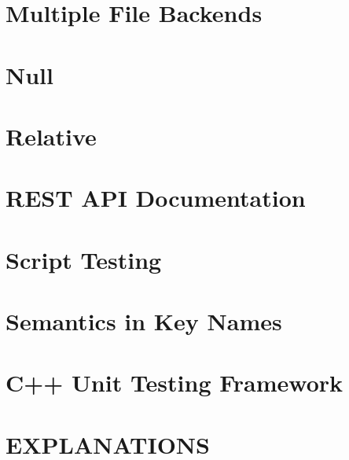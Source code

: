 \let\mypdfximage\pdfximage\def\pdfximage{\immediate\mypdfximage}\documentclass[twoside]{book}
\newcommand{\+}{\discretionary{\mbox{\scriptsize$\hookleftarrow$}}{}{}}
\begin{document}
\chapter{Multiple File Backends}
\label{doc_decisions_6_implemented_multiple_file_backends_md}

\chapter{Null}
\label{doc_decisions_6_implemented_null_md}

\chapter{Relative}
\label{doc_decisions_6_implemented_relative_md}

\chapter{REST API Documentation}
\label{doc_decisions_6_implemented_rest_api_documentation_md}

\chapter{Script Testing}
\label{doc_decisions_6_implemented_script_testing_md}

\chapter{Semantics in Key Names}
\label{doc_decisions_6_implemented_semantics_name_md}

\chapter{C++ Unit Testing Framework}
\label{doc_decisions_6_implemented_unit_testing_md}

\chapter{EXPLANATIONS}
\label{doc_decisions_EXPLANATIONS_md}

\end{document}
